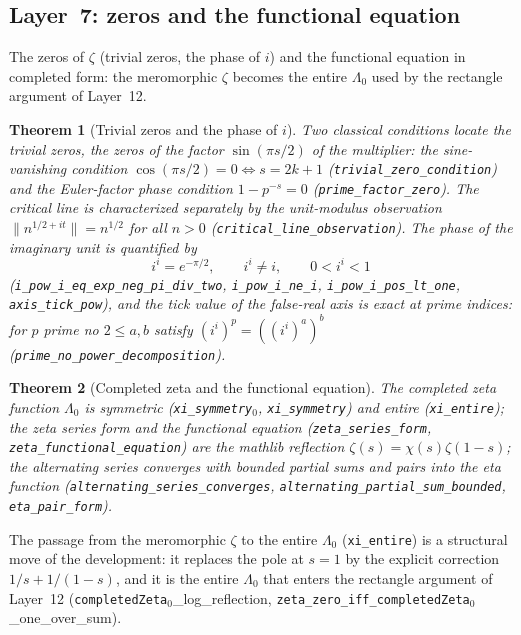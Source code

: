 \documentclass{article}
\newtheorem{theorem}{Theorem}[section]
\newcommand{\zt}{\zeta}
\newcommand{\Lam}{\Lambda}
\newcommand{\Xchi}{\chi}
\begin{document}
\subsection{Layer~7: zeros and the functional equation}
\label{sec:L7}

The zeros of $\zt$ (trivial zeros, the phase of $i$) and the
functional equation in completed form: the meromorphic $\zt$ becomes the
entire $\Lam_0$ used by the rectangle argument of Layer~12.

\begin{theorem}[Trivial zeros and the phase of $i$]
\label{thm:trivial}
Two classical conditions locate the trivial zeros, the zeros of the
factor $\sin(\pi s/2)$ of the multiplier: the sine-vanishing condition
$\cos(\pi s/2)=0\iff s=2k+1$ (\texttt{trivial\_zero\_condition}) and the
Euler-factor phase condition $1-p^{-s}=0$ (\texttt{prime\_factor\_zero}).
The critical line is characterized separately by the unit-modulus
observation $\|n^{1/2+it}\|=n^{1/2}$ for all $n>0$
(\texttt{critical\_line\_observation}). The phase
of the imaginary unit is quantified by
\[
i^i=e^{-\pi/2},\qquad i^i\neq i,\qquad 0<i^i<1
\]
(\texttt{i\_pow\_i\_eq\_exp\_neg\_pi\_div\_two}, \texttt{i\_pow\_i\_ne\_i},
\texttt{i\_pow\_i\_pos\_lt\_one}, \texttt{axis\_tick\_pow}), and the tick
value of the false-real axis is exact at prime indices: for $p$ prime no
$2\le a,b$ satisfy $(i^i)^p=((i^i)^a)^b$
(\texttt{prime\_no\_power\_decomposition}).
\end{theorem}

\begin{theorem}[Completed zeta and the functional equation]
\label{thm:xi}
The completed zeta function $\Lam_0$ is symmetric
(\texttt{xi\_symmetry}\(_0\), \texttt{xi\_symmetry}) and entire
(\texttt{xi\_entire}); the zeta series form and the functional equation
(\texttt{zeta\_series\_form}, \texttt{zeta\_functional\_equation}) are the
mathlib reflection $\zt(s)=\Xchi(s)\zt(1-s)$; the alternating series
converges with bounded partial sums and pairs into the eta function
(\texttt{alternating\_series\_converges},
\texttt{alternating\_partial\_sum\_bounded}, \texttt{eta\_pair\_form}).
\end{theorem}

The passage from the meromorphic $\zt$ to the entire $\Lam_0$
(\texttt{xi\_entire}) is a
structural move of the development: it replaces the pole at $s=1$ by
the explicit correction $1/s+1/(1-s)$, and it is the entire $\Lam_0$ that
enters the rectangle argument of Layer~12
(\texttt{completedZeta}\(_0\)\_log\_reflection,
\texttt{zeta\_zero\_iff\_completedZeta}\(_0\)\_one\_over\_sum).
\end{document}
